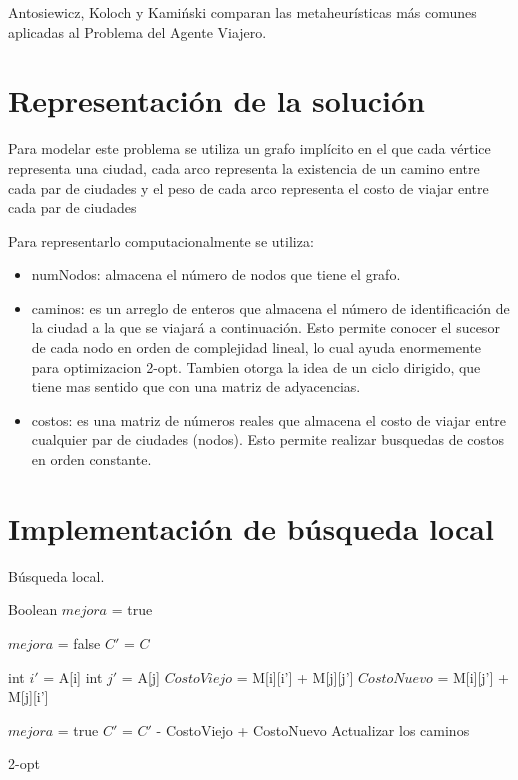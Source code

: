 \documentclass{ci5652}
\begin{document}
Antosiewicz, Koloch y Kamiński\cite{akk2013} comparan las metaheurísticas más comunes aplicadas al Problema del Agente Viajero.

\section{Representación de la solución}
Para modelar este problema se utiliza un grafo implícito en el que cada vértice representa una ciudad, cada arco representa la existencia de un camino entre cada par de ciudades y el peso de cada arco representa el costo de viajar entre cada par de ciudades

Para representarlo computacionalmente se utiliza:
\begin{itemize}
\item numNodos: almacena el número de nodos que tiene el grafo.
\item caminos: es un arreglo de enteros que almacena el número de identificación de la ciudad a la que se viajará a continuación. Esto permite conocer el sucesor de cada nodo en orden de complejidad lineal, lo cual ayuda enormemente para optimizacion 2-opt.
Tambien otorga la idea de un ciclo dirigido, que tiene mas sentido que con una matriz de adyacencias.
\item costos: es una matriz de números reales que almacena el costo de viajar entre cualquier par de ciudades (nodos). Esto permite realizar busquedas de costos en orden constante.
\end{itemize}

\newpage
\section{Implementación de búsqueda local}
Búsqueda local.

\begin{algorithm}
 \DontPrintSemicolon
 \vspace*{0.1cm}
 Boolean $mejora$ = true\;
  {
	$mejora$ = false\; 
	$C'$ = $C$\;
 	 {
		 {
			int $i'$ = A[i]\;
			int $j'$ = A[j]\;
			$CostoViejo$ = M[i][i'] + M[j][j']\;
			$CostoNuevo$ =  M[i][j'] + M[j][i']\;

	 		  {
				$mejora$ = true\;
   				$C'$ = $C'$ - CostoViejo + CostoNuevo\;
				Actualizar los caminos\;
   			}
		}
	 }
 }
 \vspace*{0.1cm}
 \caption{2-opt}
\end{algorithm}
\end{document}
